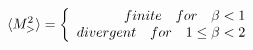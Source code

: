 \begin{equation}
\langle M^2_> \rangle = \left\{ \begin{array}{r@{\quad \quad}l}
finite\quad for\quad \beta < 1 \\divergent\quad for\quad 1\le \beta < 2 
\end{array} \right.
\end{equation} 
